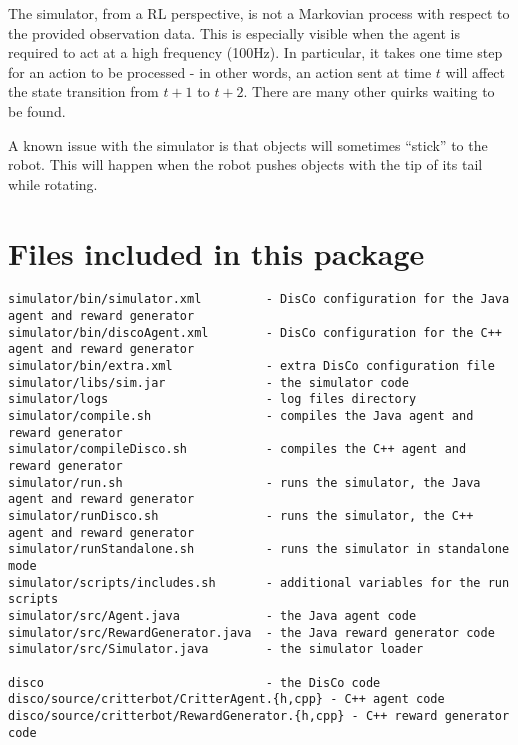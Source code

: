 \documentclass[12pt]{article}
\begin{document}
The simulator, from a RL perspective, is not a Markovian process with respect 
to the provided observation data. This is especially visible when the agent
is required to act at a high frequency (100Hz). In particular, it takes one
time step for an action to be processed - in other words, an action sent at
time $t$ will affect the state transition from $t+1$ to $t+2$. There are many
other quirks waiting to be found.

A known issue with the simulator is that objects will sometimes ``stick'' to the
robot. This will happen when the robot pushes objects with the tip of its tail
while rotating.

\newpage

\section{Files included in this package}

\footnotesize{
\begin{verbatim}
simulator/bin/simulator.xml         - DisCo configuration for the Java agent and reward generator
simulator/bin/discoAgent.xml        - DisCo configuration for the C++ agent and reward generator
simulator/bin/extra.xml             - extra DisCo configuration file 
simulator/libs/sim.jar              - the simulator code
simulator/logs                      - log files directory
simulator/compile.sh                - compiles the Java agent and reward generator
simulator/compileDisco.sh           - compiles the C++ agent and reward generator
simulator/run.sh                    - runs the simulator, the Java agent and reward generator
simulator/runDisco.sh               - runs the simulator, the C++ agent and reward generator
simulator/runStandalone.sh          - runs the simulator in standalone mode
simulator/scripts/includes.sh       - additional variables for the run scripts
simulator/src/Agent.java            - the Java agent code
simulator/src/RewardGenerator.java  - the Java reward generator code
simulator/src/Simulator.java        - the simulator loader

disco                               - the DisCo code
disco/source/critterbot/CritterAgent.{h,cpp} - C++ agent code
disco/source/critterbot/RewardGenerator.{h,cpp} - C++ reward generator code
\end{verbatim}
}
\end{document}
